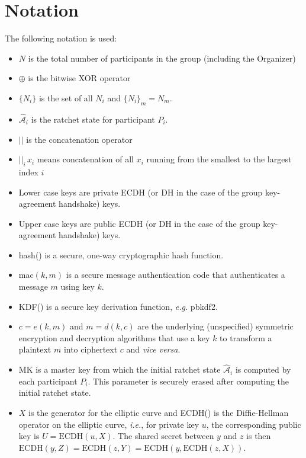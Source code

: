 \documentclass[%
preprint,
amsmath,amssymb,
aps,
prb,
floatfix,
]{revtex4-1}
\begin{document}
\section{\label{sec:notation}Notation}
The following notation is used:
\begin{itemize}
\item $N$ is the total number of participants in the group (including the
Organizer)
\item $\oplus$ is the bitwise XOR operator
\item $\{N_i\}$ is the set of all $N_i$ and $\{N_i\}_m = N_m$.
\item $\mathcal{\hat{A}}_i$ is the ratchet state for
participant $P_i$.
\item $||$ is the concatenation operator
\item $||_i \, x_i$ means concatenation of all $x_i$ running from the smallest
to the largest index $i$
\item Lower case keys are private ECDH (or DH in the case of the group
key-agreement handshake) keys.
\item Upper case keys are public ECDH (or DH in the case of the group
key-agreement handshake) keys.
\item hash() is a secure, one-way cryptographic hash function.
\item mac$(k,m)$ is a secure message authentication code that
authenticates a message $m$ using key $k$.
\item KDF() is a secure key derivation function, \textit{e.g.} pbkdf2.
\item $c = e(k, m)$ and $m = d(k,c)$ are the underlying (unspecified) symmetric
encryption and decryption algorithms that use a key $k$ to transform a plaintext
$m$ into ciphertext $c$ and \textit{vice versa}.
\item MK is a master key from which the initial ratchet state
$\mathcal{\hat{A}}_i$ is computed by each participant $P_i$. This parameter is
securely erased after computing the initial ratchet state.
\item $X$ is the generator for the elliptic curve and ECDH() is the Diffie-Hellman
operator on the elliptic curve, \textit{i.e.}, for private key $u$, the
corresponding public key is $U = \mathrm{ECDH}(u, X)$. The shared secret between
$y$ and $z$ is then $ \mathrm{ECDH}(y,Z) = \mathrm{ECDH}(z,Y) =
\mathrm{ECDH}(y,\mathrm{ECDH}(z, X))$.
\end{itemize}
\end{document}
